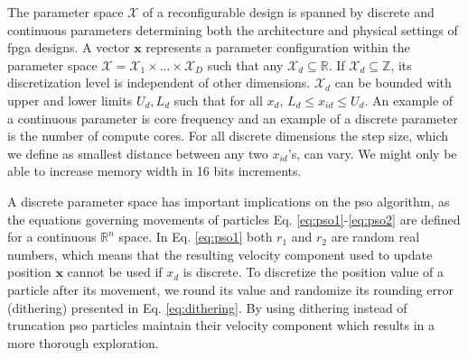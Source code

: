 \documentclass[runningheads,a4paper]{llncs}
\begin{document}
The parameter space $\mathcal{X}$ of a reconfigurable design is spanned by discrete and continuous parameters determining both the architecture and physical settings of \ac{fpga} designs. A vector $\mathbf{x}$ represents a parameter configuration within the parameter space $\mathcal{X} = \mathcal{X}_1 \times ... \times \mathcal{X}_D $ such that any $\mathcal{X}_{d} \subseteq \mathbb{R}$. If $\mathcal{X}_{d} \subseteq \mathbb{Z}$, its discretization level is independent of other dimensions. $\mathcal{X}_{d}$ can be bounded with upper and lower limits $U_d,L_d$ such that for all $x_{d}$, $L_d \leq x_{id} \leq U_d$. An example of a continuous parameter is core frequency and an example of a discrete parameter is the number of compute cores. For all discrete dimensions the step size, which we define as smallest distance between any two $x_{id}$'s, can vary. We might only be able to increase memory width in 16 bits increments. 


A discrete parameter space has important implications on the \ac{pso} algorithm, as the equations governing movements of particles Eq. \ref{eq:pso1}-\ref{eq:pso2} are defined for a continuous $\mathbb{R}^{n}$ space. In Eq. \ref{eq:pso1} both $r_{1}$ and $r_2$ are random real numbers, which means that the resulting velocity component used to update position $\mathbf{x}$ cannot be used if $x_d$ is discrete. To discretize the position value of a particle after its movement, we round its value and randomize its rounding error (dithering) presented in Eq. \ref{eq:dithering}. By using dithering instead of truncation \ac{pso} particles maintain their velocity component which results in a more thorough exploration.



\end{document}
